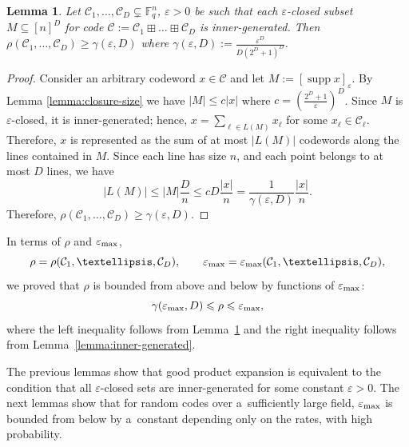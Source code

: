 \documentclass[conference]{IEEEtran}
\newcommand{\rbr}[1]{\left(#1\right)}
\let\le\leqslant
\let\ge\geqslant
\newcommand{\eps}{\varepsilon}
\theoremstyle{plain}
\newtheorem{lemma}[theorem]{Lemma}
\theoremstyle{definition}
\theoremstyle{remark}
\newcommand{\cC}{\mathcal{C}}
\newcommand{\F}{\mathbb{F}}
\DeclareMathOperator{\supp}{supp}
\begin{document}
\begin{lemma}\label{lemma:ig-exp}
    Let $\cC_1,\dots,\cC_D\subsetneq \F_q^n$, $\eps>0$ be such that each $\eps$-closed subset $M\subseteq [n]^D$ for code $\cC:=\cC_1\boxplus\ldots\boxplus\cC_D$ is inner-generated. Then $\rho(\cC_1,\dots,\cC_D)\ge \gamma(\eps,D)$ 
    where $\gamma(\eps,D):=\frac{\eps^D}{D(2^D+1)^D}$.
\end{lemma}
\begin{proof}
    Consider an arbitrary codeword $x\in \cC$ and let $M:=[\supp x]_\eps$. 
    By Lemma \ref{lemma:closure-size} we have $|M|\le c|x|$ where $c=\rbr{\frac{2^D+1}{\eps}}^{D}$. 
    Since $M$ is $\eps$-closed, it is inner-generated; hence, $x=\sum_{\ell\in L(M)}x_\ell$ for some $x_\ell\in\cC_\ell$. 
    Therefore, $x$ is represented as the sum of at most $|L(M)|$ codewords along the lines contained in $M$. 
    Since each line has size $n$, and each point belongs to at most $D$ lines, we have 
    \[|L(M)|\le |M|\frac{D}{n}\le cD\frac{|x|}{n}=\frac{1}{\gamma(\eps,D)}\frac{|x|}{n}.\]
    Therefore, $\rho(\cC_1,\dots,\cC_D)\ge \gamma(\eps,D)$.
\end{proof}
In terms of $\rho$ and $\epsmax$,\[
\rho=\rho(\cC_1,\ldots,\cC_D),\qquad \epsmax=\epsmax(\cC_1,\ldots,\cC_D),
\]
we proved that $\rho$ is bounded from above and below by functions of $\epsmax$:
\[
    \gamma(\epsmax,D)
    \le \rho \le \epsmax,
\]
where the left inequality follows from Lemma~\ref{lemma:ig-exp} and the right inequality follows from Lemma~\ref{lemma:inner-generated}.


The previous lemmas show that good product expansion is equivalent to the condition that all $\eps$-closed sets are inner-generated for some constant $\eps>0$. 
The next lemmas show that for random codes over a~sufficiently large field, $\epsmax$ is bounded from below by a~constant depending only on the rates, with high probability.
\end{document}
